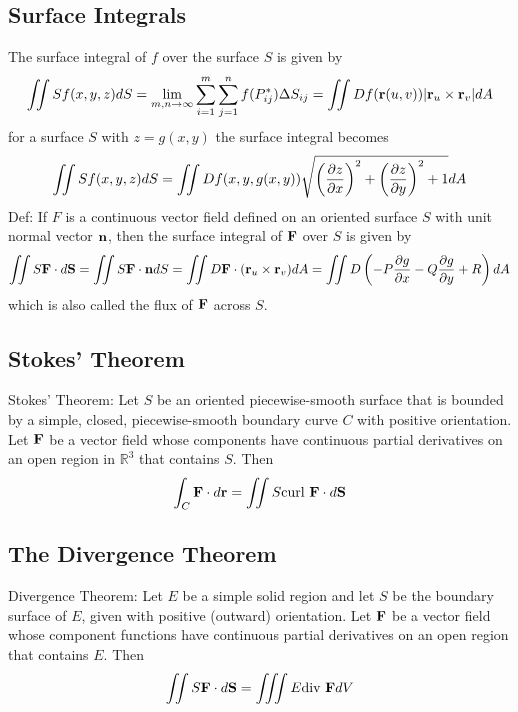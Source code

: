 \documentclass{article}
\begin{document}
    \subsection{Surface Integrals}
    \begin{outline}
        \1 The surface integral of $f$ over the surface $S$ is given by \[\iint\limits Sf(x,y,z)dS=\lim_{m,n\to\infty}\sum^m_{i=1}\sum^n_{j=1}f(P^*_{ij})\Delta S_{ij}=\iint\limits Df(\vb r(u,v))|\vb r_u\times\vb r_v|dA\]
        \1 for a surface $S$ with \(z=g(x,y)\) the surface integral becomes \[\iint\limits Sf(x,y,z)dS=\iint\limits Df(x,y,g(x,y))\sqrt{\left(\pdv{z}{x}\right)^2+\left(\pdv{z}{y}\right)^2+1}dA\]
        \1 Def: If $F$ is a continuous vector field defined on an oriented surface $S$ with unit normal vector $\vb n$, then the surface integral of \(\vb F\) over $S$ is given by \[\iint\limits S\vb F\cdot d\vb S=\iint\limits S\vb F\cdot\vb ndS=\iint\limits D\vb F\cdot(\vb r_u\times\vb r_v)dA=\iint\limits D\left(-P\pdv{g}{x}-Q\pdv{g}{y}+R\right)dA\] which is also called the flux of \(\vb F\) across $S$. 

    \end{outline}
    \subsection{Stokes' Theorem}
    \begin{outline}
        \1 Stokes' Theorem: Let $S$ be an oriented piecewise-smooth surface that is bounded by a simple, closed, piecewise-smooth boundary curve $C$ with positive orientation. Let \(\vb F\) be a vector field whose components have continuous partial derivatives on an open region in \(\mathbb R^3\) that contains $S$. Then \[\int_C\vb F\cdot d\vb r=\iint\limits S\text{curl }\vb F\cdot d\vb S\]

    \end{outline}
    \subsection{The Divergence Theorem}
    \begin{outline}
        \1 Divergence Theorem: Let $E$ be a simple solid region and let $S$ be the boundary surface of $E$, given with positive (outward) orientation. Let \(\vb F\) be a vector field whose component functions have continuous partial derivatives on an open region that contains $E$. Then \[\iint\limits S\vb F\cdot d\vb S=\iiint\limits E\text{div }\vb FdV\]

    \end{outline}
\end{document}
